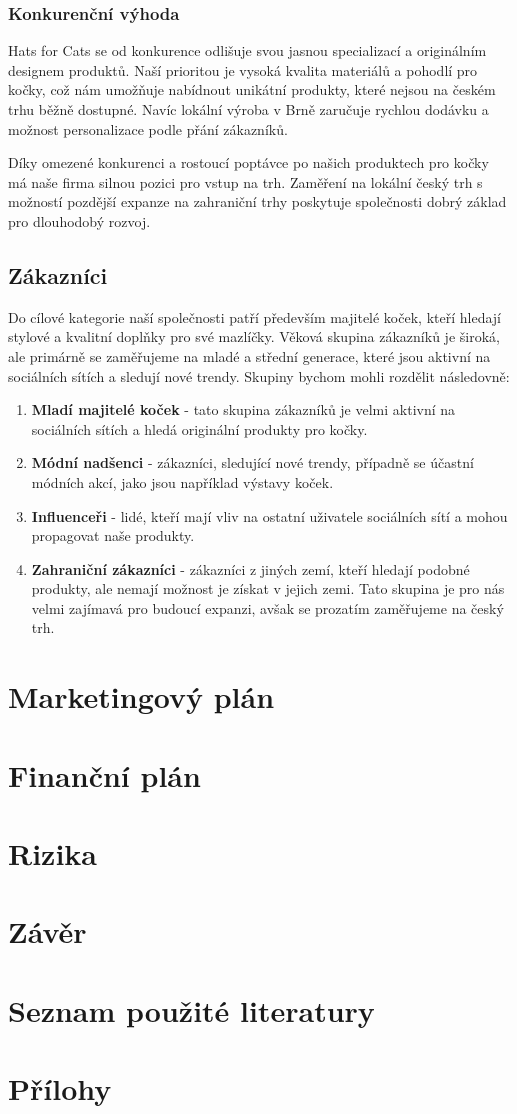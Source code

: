 \documentclass[12pt, a4paper]{article}
\begin{document}
\subsubsection{Konkurenční výhoda}
Hats for Cats se od konkurence odlišuje svou jasnou specializací a originálním designem produktů. Naší prioritou je vysoká kvalita materiálů a pohodlí pro kočky,
což nám umožňuje nabídnout unikátní produkty, které nejsou na českém trhu běžně dostupné.
Navíc lokální výroba v Brně zaručuje rychlou dodávku a možnost personalizace podle přání zákazníků.

\vspace{10pt}
\noindent Díky omezené konkurenci a rostoucí poptávce po našich produktech pro kočky má naše firma silnou pozici pro vstup na trh.
Zaměření na lokální český trh s možností pozdější expanze na zahraniční trhy poskytuje společnosti dobrý základ pro dlouhodobý rozvoj.

\subsection{Zákazníci}

Do cílové kategorie naší společnosti patří především majitelé koček, kteří hledají stylové a kvalitní doplňky pro své mazlíčky.
Věková skupina zákazníků je široká, ale primárně se zaměřujeme na mladé a střední generace, které jsou aktivní na sociálních sítích a sledují nové trendy.
Skupiny bychom mohli rozdělit následovně:

\begin{enumerate}
  \item \textbf{Mladí majitelé koček} - tato skupina zákazníků je velmi aktivní 
  na sociálních sítích a hledá originální produkty pro kočky.
  \item \textbf{Módní nadšenci} - zákazníci, sledující nové trendy,
  případně se účastní módních akcí, jako jsou například výstavy koček.
  \item \textbf{Influenceři} - lidé, kteří mají vliv na ostatní uživatele 
  sociálních sítí a mohou propagovat naše produkty.
  \item \textbf{Zahraniční zákazníci} - zákazníci z jiných zemí, kteří hledají
  podobné produkty, ale nemají možnost je získat v jejich zemi. Tato skupina je pro
  nás velmi zajímavá pro budoucí expanzi, avšak se prozatím zaměřujeme na český trh.
\end{enumerate}

\section{Marketingový plán}
\section{Finanční plán}
\section{Rizika}
\section{Závěr}
\section{Seznam použité literatury}
\printbibliography[heading=none]
\section{Přílohy}
\end{document}
